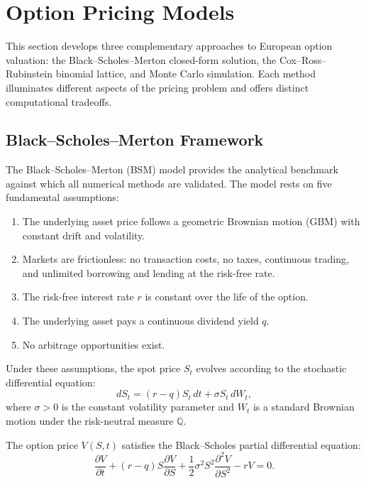 \documentclass[11pt,a4paper]{article}
\begin{document}
\section{Option Pricing Models}\label{sec:pricing}

This section develops three complementary approaches to European option valuation: the Black--Scholes--Merton closed-form solution, the Cox--Ross--Rubinstein binomial lattice, and Monte Carlo simulation. Each method illuminates different aspects of the pricing problem and offers distinct computational tradeoffs.

\subsection{Black--Scholes--Merton Framework}\label{subsec:bsm}

The Black--Scholes--Merton (BSM) model \citep{black1973pricing} provides the analytical benchmark against which all numerical methods are validated. The model rests on five fundamental assumptions:

\begin{enumerate}[label=(\alph*)]
    \item The underlying asset price follows a geometric Brownian motion (GBM) with constant drift and volatility.
    \item Markets are frictionless: no transaction costs, no taxes, continuous trading, and unlimited borrowing and lending at the risk-free rate.
    \item The risk-free interest rate $r$ is constant over the life of the option.
    \item The underlying asset pays a continuous dividend yield $q$.
    \item No arbitrage opportunities exist.
\end{enumerate}

Under these assumptions, the spot price $S_t$ evolves according to the stochastic differential equation:
\begin{equation}\label{eq:gbm}
    dS_t = (r - q) S_t \, dt + \sigma S_t \, dW_t,
\end{equation}
where $\sigma > 0$ is the constant volatility parameter and $W_t$ is a standard Brownian motion under the risk-neutral measure $\mathbb{Q}$.

The option price $V(S, t)$ satisfies the Black--Scholes partial differential equation:
\begin{equation}\label{eq:bs_pde}
    \frac{\partial V}{\partial t} + (r - q) S \frac{\partial V}{\partial S} + \frac{1}{2} \sigma^2 S^2 \frac{\partial^2 V}{\partial S^2} - rV = 0.
\end{equation}
\end{document}
